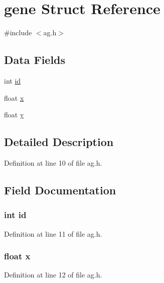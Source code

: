 \hypertarget{structgene}{}\section{gene Struct Reference}
\label{structgene}


{\ttfamily \#include $<$ag.\+h$>$}

\subsection*{Data Fields}
\begin{DoxyCompactItemize}
\item 
int \hyperlink{structgene_a7441ef0865bcb3db9b8064dd7375c1ea}{id}
\item 
float \hyperlink{structgene_ad0da36b2558901e21e7a30f6c227a45e}{x}
\item 
float \hyperlink{structgene_aa4f0d3eebc3c443f9be81bf48561a217}{y}
\end{DoxyCompactItemize}


\subsection{Detailed Description}


Definition at line 10 of file ag.\+h.



\subsection{Field Documentation}
\hypertarget{structgene_a7441ef0865bcb3db9b8064dd7375c1ea}{}
\subsubsection[{id}]{\setlength{\rightskip}{0pt plus 5cm}int id}\label{structgene_a7441ef0865bcb3db9b8064dd7375c1ea}


Definition at line 11 of file ag.\+h.

\hypertarget{structgene_ad0da36b2558901e21e7a30f6c227a45e}{}
\subsubsection[{x}]{\setlength{\rightskip}{0pt plus 5cm}float x}\label{structgene_ad0da36b2558901e21e7a30f6c227a45e}


Definition at line 12 of file ag.\+h.

